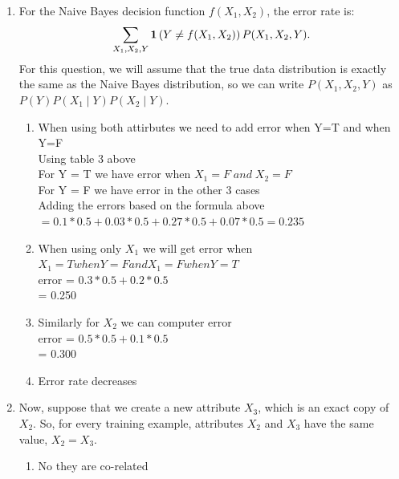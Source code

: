 \begin{enumerate}
\item For the Naive Bayes decision function $f(X_1, X_2)$,
  the error rate is:
  \begin{equation*}
    \sum_{X_1,X_2,Y} \mathbf{1}\left(Y \ne f(X_1,X_2)\right)P(X_1, X_2, Y).
  \end{equation*}
  For this question, we will assume that the true data distribution is
  exactly the same as the Naive Bayes distribution, so we can write
  $P(X_1, X_2, Y)$ as $P(Y)P(X_1 \mid Y)P(X_2 \mid Y)$.

  \begin{enumerate}
    \item When using both attirbutes we need to add error when Y=T and when Y=F \\
Using table 3 above \\
For Y = T we have error when $X_1 =F\; and \; X_2 = F$\\
For Y = F we have error in the other 3 cases \\
Adding the errors based on the formula above \\
$= 0.1 * 0.5 + 0.03*0.5+0.27*0.5 + 0.07*0.5 = 0.235$


    \item When using only $X_1$ we will get error when $X_1 = T when Y = F and X_1 = F when Y = T $\\
	error = $0.3*0.5+0.2*0.5$ \\
		= 0.250
   
    \item Similarly for $X_2$ we can computer error \\
	error = $0.5*0.5 + 0.1*0.5$ \\
		= 0.300

    \item  Error rate decreases 
            
  \end{enumerate}

\item Now, suppose that we create a new attribute $X_3$,
  which is an exact copy of $X_2$. So, for every training example,
  attributes $X_2$ and $X_3$ have the same value, $X_2 = X_3$.

  \begin{enumerate}
  \item No they are co-related


\end{enumerate}
\end{enumerate}
